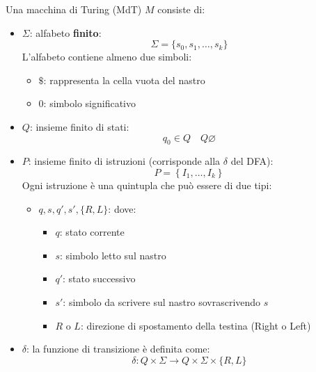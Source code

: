 \documentclass[a4paper]{article}
\begin{document}
\begin{definition}
  Una macchina di Turing (MdT) \( M \) consiste di:
  \begin{itemize}
    \item \( \Sigma \): alfabeto \textbf{finito}:
      \[
        \Sigma = \{ s_0, s_1, \ldots, s_k \}
      \] 
      L'alfabeto contiene almeno due simboli:
      \begin{itemize}
        \item \( \$ \): rappresenta la cella vuota del nastro
        \item \( 0 \): simbolo significativo
      \end{itemize}

    \item \( Q \): insieme finito di stati:
      \[
        q_0 \in Q \quad Q \varnothing
      \] 

    \item \( P \): insieme finito di istruzioni (corrisponde alla \( \delta \) del DFA):
      \[
        P = \left\{ I_1, \ldots, I_k \right\}
      \] 
      Ogni istruzione è una quintupla che può essere di due tipi:
      \begin{itemize}
        \item \( q,s,q',s', \{R, L\}  \): dove:
          \begin{itemize}
            \item \( q \): stato corrente
            \item \( s \): simbolo letto sul nastro
            \item \( q' \): stato successivo
            \item \( s' \): simbolo da scrivere sul nastro sovrascrivendo \( s \)
            \item \( R \) o \( L \): direzione di spostamento della testina (Right o Left)
          \end{itemize}
      \end{itemize}
    \item \( \delta \): la funzione di transizione è definita come:
      \[
        \delta: Q \times \Sigma \to Q \times \Sigma \times \{R, L\}
      \] 
  \end{itemize}
\end{definition}
\end{document}

